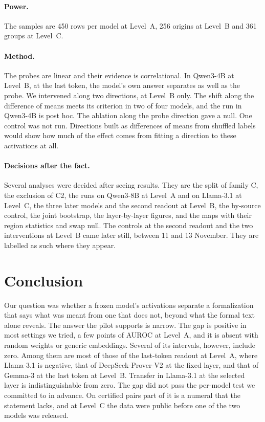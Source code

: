 \documentclass[10pt]{article}
\begin{document}
\paragraph{Power.}
The samples are 450 rows per model at Level~A, 256 origins at Level~B and 361 groups at Level~C.

\paragraph{Method.}
The probes are linear and their evidence is correlational. In Qwen3-4B at Level~B, at the last token, the model's own answer separates as well as the probe. We intervened along two directions, at Level~B only. The shift along the difference of means meets its criterion in
two of four models, and the run in Qwen3-4B is post hoc. The ablation along the probe direction gave a null.
One control was not run. Directions built as differences of means from shuffled labels would show how much of the
effect comes from fitting a direction to these activations at all.

\paragraph{Decisions after the fact.}
Several analyses were decided after seeing results. They are the split of family C, the exclusion of C2, the runs on Qwen3-8B at Level~A and on Llama-3.1 at Level~C, the three later models and the second readout at Level~B, the by-source
control, the joint bootstrap, the layer-by-layer figures, and the maps with their region statistics and swap null.
The controls at the second readout and the two interventions at Level~B came later still, between 11 and 13
November. They are labelled as such where they appear.

\section{Conclusion}

Our question was whether a frozen model's activations separate a formalization that says what was meant from
one that does not, beyond what the formal text alone reveals. The answer the pilot supports is narrow. The gap is
positive in most settings we tried, a few points of AUROC at Level~A, and it is absent with random weights or
generic embeddings. Several of its intervals, however, include zero. Among them are most of those of the last-token readout at Level~A, where Llama-3.1 is negative, that of
DeepSeek-Prover-V2 at the fixed layer, and that of Gemma-3 at the last token at Level~B. Transfer in
Llama-3.1 at the selected layer is indistinguishable from zero. The gap did not pass the per-model test we
committed to in advance. On certified pairs part of it is a numeral that the statement lacks, and at Level~C the
data were public before one of the two models was released.
\end{document}
